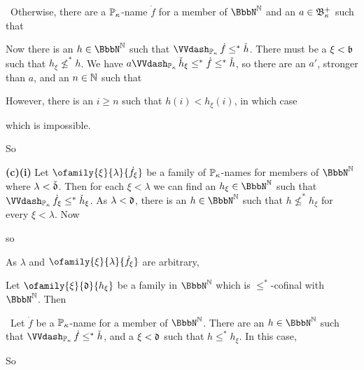{\noindent\Prf\Quer\ Otherwise, there are a $\Bbb P_{\kappa}$-name $\dot f$ for a
member of $\BbbN^{\Bbb N}$ and an $a\in\frak B_{\kappa}^+$ such that


\noindent Now there is an $h\in\BbbN^{\Bbb N}$ such that
$\VVdPk\,\dot f\le^*\check h$.
There must be a $\xi<{\frak b}$ such that $h_{\xi}\not\le^*h$.   We have
$a\VVdPk\,\check h_{\xi}\le^*\dot f\le^*\check h$, so there are an $a'$,
stronger than $a$, and an $n\in\Bbb N$ such that


\noindent However, there is an $i\ge n$ such that $h(i)<h_{\xi}(i)$, in
which case


\noindent  which is impossible.\ \Bang\Qed

So


\medskip

{\bf (c)(i)} Let $\ofamily{\xi}{\lambda}{\dot f_{\xi}}$ be a family of
$\Bbb P_{\kappa}$-names for members of $\BbbN^{\Bbb N}$ where
$\lambda<\check{\frak d}$.
Then for each $\xi<\lambda$ we can find an $h_{\xi}\in\BbbN^{\Bbb N}$ such
that $\VVdPk\,\dot f_{\xi}\le^*\check h_{\xi}$.   As $\lambda<{\frak d}$, there
is an $h\in\BbbN^{\Bbb N}$ such that $h\not\le^*h_{\xi}$ for every
$\xi<\lambda$.   Now


\noindent so


\noindent As $\lambda$ and
$\ofamily{\xi}{\lambda}{\dot f_{\xi}}$ are arbitrary,


\medskip

 Let $\ofamily{\xi}{{\frak d}}{h_{\xi}}$ be a family in
$\BbbN^{\Bbb N}$ which is $\le^*$-cofinal with $\BbbN^{\Bbb N}$.
Then


\noindent\Prf\ Let $\dot f$ be a $\Bbb P_{\kappa}$-name for a
member of $\BbbN^{\Bbb N}$.  There are an $h\in\BbbN^{\Bbb N}$ such that
$\VVdPk\,\dot f\le^*\check h$, and a $\xi<{\frak d}$ such that
$h\le^*h_{\xi}$.   In this case,


\noindent So

}%

